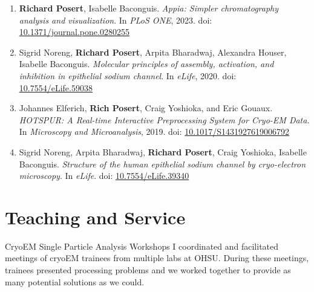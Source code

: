 \documentclass{prometheus_cv}
\begin{document}
\begin{enumerate}
	\setlength{\itemsep}{0pt}
	\item \textbf{Richard Posert}, Isabelle Baconguis. \textit{Appia: Simpler chromatography analysis and visualization}. In \textit{PLoS ONE}, 2023. doi: \href{https://doi.org/10.1371/journal.pone.0280255}{10.1371/journal.pone.0280255}
	\item Sigrid Noreng, \textbf{Richard Posert}, Arpita Bharadwaj, Alexandra Houser, Isabelle Baconguis. \textit{Molecular principles of assembly, activation, and inhibition in epithelial sodium channel}. In \textit{eLife}, 2020. doi: \href{https://doi.org/10.7554/eLife.59038}{10.7554/eLife.59038}
	\item Johannes Elferich, \textbf{Rich Posert}, Craig Yoshioka, and Eric Gouaux. \textit{HOTSPUR: A Real-time Interactive Preprocessing System for Cryo-EM Data}. In \textit{Microscopy and Microanalysis}, 2019. doi: \href{https://doi.org/10.1017/S1431927619006792}{10.1017/S1431927619006792}
	\item Sigrid Noreng, Arpita Bharadwaj, \textbf{Richard Posert}, Craig Yoshioka, Isabelle Baconguis. \textit{Structure of the human epithelial sodium channel by cryo-electron microscopy}. In \textit{eLife}. doi: \href{https://doi.org/10.7554/eLife.39340}{10.7554/eLife.39340}
	\setcounter{publicationCounter}{\value{enumi}}	%
\end{enumerate}


\section{Teaching and Service}

{}
{CryoEM Single Particle Analysis Workshops}
{%
	I coordinated and facilitated meetings of cryoEM trainees from multiple labs at OHSU.
	During these meetings, trainees presented processing problems and we worked together to provide as many potential solutions as we could.
}
\end{document}
